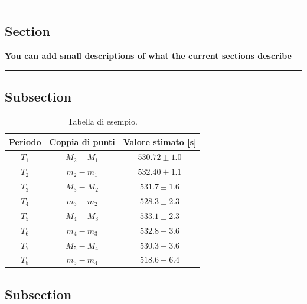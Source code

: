 {\color{gray}\hrule}
\begin{center}
\section{Section}
\textbf{You can add small descriptions of what the current sections describe}
\bigskip
\end{center}
{\color{gray}\hrule}
\subsection{Subsection}
\lipsum[1-3]
\begin{table}[H]
    \centering
    \begin{tabular}{|c|c|c|}
    \hline
       \textbf{Periodo} &\textbf{Coppia di punti} & \textbf{Valore stimato [s]} \\ \hline \hline
        $T_1$ & $M_2- M_1$ & $530.72\pm 1.0$ \\ \hline
        $T_2$ &$ m_2- m_1$ & $532.40\pm 1.1 $\\ \hline
        $T_3$ &$ M_3 -M_2$ & $531.7\pm 1.6 $\\ \hline
        $T_4$ &$ m_3- m_2$ &$ 528.3\pm 2.3$ \\ \hline
        $T_5$ &$ M_4- M_3 $& $533.1\pm 2.3$ \\ \hline
        $T_6$ &$ m_4- m_3$ & $532.8\pm 3.6$ \\ \hline
        $T_7$ & $M_5 - M_4$ & $530.3\pm 3.6$ \\ \hline
        $T_8$ & $m_5- m_4$ & $518.6\pm 6.4 $\\ \hline
    \end{tabular}
    \caption{\small Tabella di esempio.}
    \label{tab:periodi}
\end{table}
\subsection{Subsection}
\lipsum[1-2]
